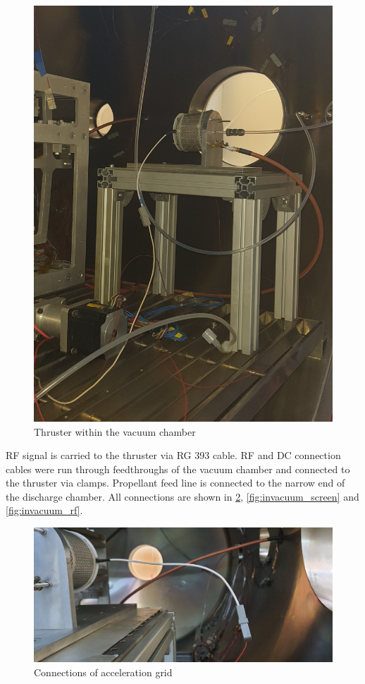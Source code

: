 \begin{figure}[h]
    \centering
    \includegraphics[scale=0.15]{fig/invacuum_assembly.jpg}
    \caption{Thruster within the vacuum chamber}
    \label{fig:invacuum_assm}
\end{figure}

RF signal is carried to the thruster via RG 393 cable. RF and DC connection cables were run through feedthroughs of the vacuum chamber and connected to the thruster via clamps. Propellant feed line is connected to the narrow end of the discharge chamber. All connections are shown in \ref{fig:invacuum_accel}, \ref{fig:invacuum_screen} and \ref{fig:invacuum_rf}. 
\newpage
\begin{figure}[h]
    \centering
    \includegraphics[scale=0.12]{fig/invacuum_accel.jpg}
    \caption{Connections of acceleration grid}
    \label{fig:invacuum_accel}
\end{figure}

